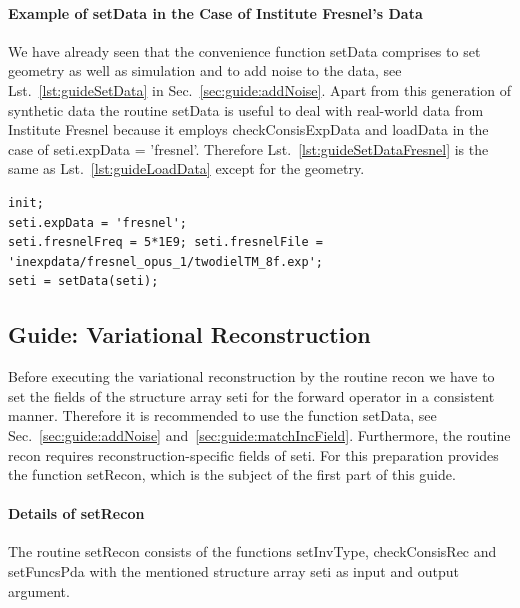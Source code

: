 \documentclass[a4paper]{article}
\begin{document}
\paragraph{Example of \textsf{setData} in the Case of Institute Fresnel's Data} We have already seen that the convenience function \textsf{setData} comprises to set geometry as well as simulation and to add noise to the data, see Lst.~\ref{lst:guideSetData} in Sec.~\ref{sec:guide:addNoise}. Apart from this generation of synthetic data the routine \textsf{setData} is useful to deal with real-world data from Institute Fresnel because it employs \textsf{checkConsisExpData} and \textsf{loadData} in the case of \textsf{seti.expData = 'fresnel'}. Therefore Lst.~\ref{lst:guideSetDataFresnel} is the same as Lst.~\ref{lst:guideLoadData} except for the geometry.

\begin{lstlisting}[caption={Process Institute Fresnel's data with \textsf{setData} (\emph{source code}: \textsf{guides/guideSetDataFresnel.m}).},label=lst:guideSetDataFresnel]
init;
seti.expData = 'fresnel';
seti.fresnelFreq = 5*1E9; seti.fresnelFile = 'inexpdata/fresnel_opus_1/twodielTM_8f.exp';
seti = setData(seti);
\end{lstlisting}


\subsection{Guide: Variational Reconstruction}\label{sec:guide:recon}

Before executing the variational reconstruction by the routine \textsf{recon} we have to set the fields of the structure array \textsf{seti} for the forward operator in a consistent manner. Therefore it is recommended to use the function \textsf{setData}, see Sec.~\ref{sec:guide:addNoise} and~\ref{sec:guide:matchIncField}. Furthermore, the routine \textsf{recon} requires reconstruction-specific fields of \textsf{seti}. For this preparation \IPscatt provides the function \textsf{setRecon}, which is the subject of the first part of this guide.

\paragraph{Details of \textsf{setRecon}} The routine \textsf{setRecon} consists of the functions \textsf{setInvType}, \textsf{checkConsisRec} and \textsf{setFuncsPda} with the mentioned structure array \textsf{seti} as input and output argument.
\end{document}
